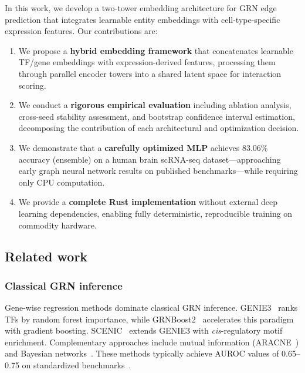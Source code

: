 \documentclass[10pt,twocolumn]{article}
\begin{document}
In this work, we develop a two-tower embedding architecture for GRN edge prediction that integrates learnable entity embeddings with cell-type-specific expression features.
Our contributions are:
\begin{enumerate}
    \item We propose a \textbf{hybrid embedding framework} that concatenates learnable TF/gene embeddings with expression-derived features, processing them through parallel encoder towers into a shared latent space for interaction scoring.

    \item We conduct a \textbf{rigorous empirical evaluation} including ablation analysis, cross-seed stability assessment, and bootstrap confidence interval estimation, decomposing the contribution of each architectural and optimization decision.

    \item We demonstrate that a \textbf{carefully optimized MLP} achieves 83.06\% accuracy (ensemble) on a human brain scRNA-seq dataset---approaching early graph neural network results on published benchmarks---while requiring only CPU computation.

    \item We provide a \textbf{complete Rust implementation} without external deep learning dependencies, enabling fully deterministic, reproducible training on commodity hardware.
\end{enumerate}

\subsection{Related work}
\label{sec:related}

\subsubsection{Classical GRN inference}
Gene-wise regression methods dominate classical GRN inference.
GENIE3~\cite{huynh2010inferring} ranks TFs by random forest importance, while GRNBoost2~\cite{moerman2019grnboost2} accelerates this paradigm with gradient boosting.
SCENIC~\cite{aibar2017scenic} extends GENIE3 with \textit{cis}-regulatory motif enrichment.
Complementary approaches include mutual information (ARACNE~\cite{margolin2006aracne}) and Bayesian networks~\cite{friedman2000bayesian}.
These methods typically achieve AUROC values of 0.65--0.75 on standardized benchmarks~\cite{pratapa2020benchmarking}.
\end{document}
